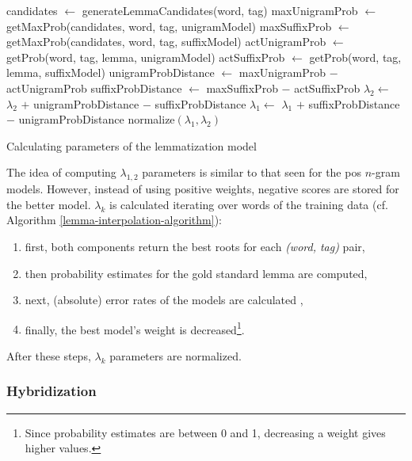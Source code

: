\begin{algorithm*}
\begin{algorithmic}[H]
        \State candidates $\gets$ generateLemmaCandidates(word, tag)
        \State maxUnigramProb $\gets$ getMaxProb(candidates, word, tag, unigramModel)
        \State maxSuffixProb $\gets$ getMaxProb(candidates, word, tag, suffixModel)
        \State actUnigramProb $\gets$ getProb(word, tag, lemma, unigramModel)
        \State actSuffixProb $\gets$ getProb(word, tag, lemma, suffixModel)
        \State unigramProbDistance $\gets$ maxUnigramProb $-$ actUnigramProb
        \State suffixProbDistance $\gets$ maxSuffixProb $-$ actSuffixProb
            \State $\lambda_{2} \gets$ $\lambda_{2}$ $+$ unigramProbDistance $-$ suffixProbDistance
        \Else%
            \State $\lambda_{1} \gets$ $\lambda_{1}$ $+$ suffixProbDistance $-$ unigramProbDistance
        \EndIf
    \EndFor
    \State normalize$( \lambda_{1}, \lambda_{2} )$
  \end{algorithmic}
  \caption{Calculating parameters of the lemmatization model}
\label{lemma-interpolation-algorithm}
\end{algorithm*}

The idea of computing $\lambda_{1,2}$ parameters is similar to that seen for the \gls{pos} $n$-gram models. 
However, instead of using positive weights, negative scores are stored for the better model.  
$\lambda_{k}$ is calculated iterating over words of the training data (cf. Algorithm \ref{lemma-interpolation-algorithm}):
\begin{enumerate}
  \item first, both components return the best roots for each \emph{(word, tag)} pair, 
  \item then probability estimates for the gold standard lemma are computed,
  \item next, (absolute) error rates of the models are calculated ,
  \item finally, the best model’s weight is decreased\footnote{Since probability estimates are between 0 and 1, decreasing a weight gives higher values.}.
\end{enumerate}
After these steps, $\lambda_k$ parameters are normalized.


\subsubsection{Hybridization}

